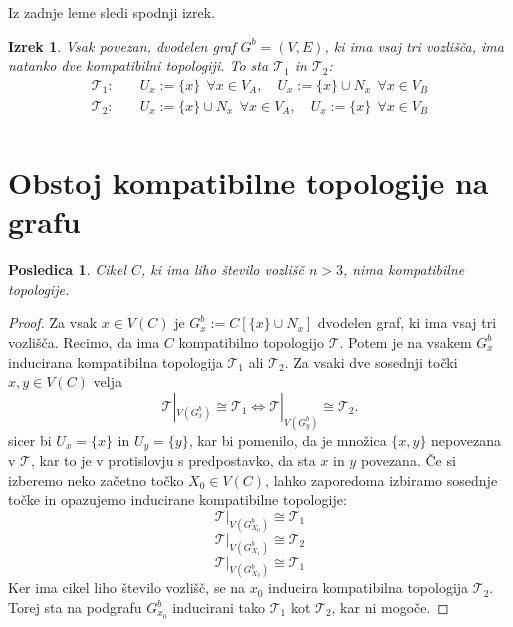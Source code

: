 \documentclass[a4paper, 12pt]{book}
\newtheorem{theorem}{Izrek}[section]
\newtheorem{corollary}{Posledica}[section]
\theoremstyle{definition}
\theoremstyle{remark}
\begin{document}
Iz zadnje leme sledi spodnji izrek.
\begin{theorem}
Vsak povezan, dvodelen graf $G^b = (V,E)$, ki ima vsaj tri vozlišča, ima natanko
dve kompatibilni topologiji. To sta $\mathcal{T}_1$ in $\mathcal{T}_2$:
\[
  \begin{split}
  \mathcal{T}_1:&\quad
  U_x:=\{x\}\ \ \forall x \in V_A, \quad
  U_x:=\{x\}\cup N_x\ \  \forall x \in V_B\\
  \mathcal{T}_2:&\quad
  U_x:=\{x\}\cup N_x\ \  \forall x \in V_A, \quad
  U_x:=\{x\}\ \ \forall x \in V_B\\
\end{split}
\]
\end{theorem}

\section{Obstoj kompatibilne topologije na grafu} \label{obstoj}

\begin{corollary}\label{corollary1}
Cikel $C$, ki ima liho število vozlišč $n > 3$, nima kompatibilne topologije.
\end{corollary}
\begin{proof}
Za vsak $x \in V(C)$ je $G_x^b := C[\{x\} \cup N_x]$ dvodelen graf, ki ima vsaj tri
vozlišča. Recimo, da ima $C$ kompatibilno topologijo $\mathcal{T}$. Potem je na vsakem $G_x^b$ inducirana 
kompatibilna topologija $\mathcal{T}_1$ ali $\mathcal{T}_2$. Za vsaki dve sosednji točki $x,y \in V(C)$ velja
\[
  \mathcal{T}|_{V(G_x^b)} \cong \mathcal{T}_1 \iff \mathcal{T}|_{V(G_y^b)} \cong \mathcal{T}_2.
\]
sicer bi $U_x = \{x\}$ in $U_y = \{y\}$, kar bi pomenilo, da je množica
$\{x, y\}$ nepovezana v $\mathcal{T}$, kar to je v protislovju s predpostavko, da sta $x$ in
$y$ povezana. Če si izberemo neko začetno točko $X_0 \in V(C)$, lahko zaporedoma
izbiramo sosednje točke in opazujemo inducirane kompatibilne topologije:
\[\mathcal{T}|_{V(G_{X_0}^b)} \cong \mathcal{T}_1\]
\[\mathcal{T}|_{V(G_{X_1}^b)} \cong \mathcal{T}_2\]
\[\mathcal{T}|_{V(G_{X_3}^b)} \cong \mathcal{T}_1\]
Ker ima cikel liho število vozlišč, se na $x_0$ inducira kompatibilna topologija $\mathcal{T}_2$. Torej
sta na podgrafu $G^b_{x_0}$ inducirani tako $\mathcal{T}_1$ kot $\mathcal{T}_2$, kar ni mogoče.
\end{proof}
\end{document}
